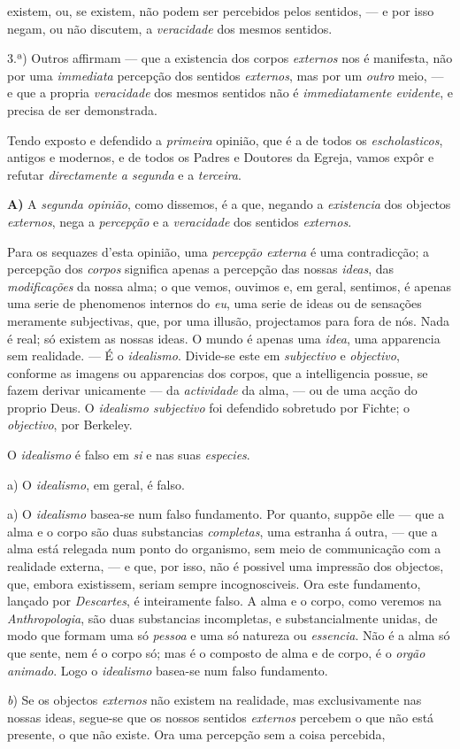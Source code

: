 existem, ou, se existem, não podem ser percebidos pelos sentidos, --- e por isso negam, ou não discutem, a \emph{veracidade} dos mesmos sentidos.\par 3.ª) Outros affirmam --- que a existencia dos corpos \emph{externos} nos é manifesta, não por uma \emph{immediata} percepção dos sentidos \emph{externos}, mas por um \emph{outro} meio, --- e que a propria \emph{veracidade} dos mesmos sentidos não é \emph{immediatamente evidente}, e precisa de ser demonstrada.\par Tendo exposto e defendido a \emph{primeira} opinião, que é a de todos os \emph{escholasticos}, antigos e modernos, e de todos os Padres e Doutores da Egreja, vamos expôr e refutar \emph{directamente a segunda} e a \emph{terceira}.\par \textbf{A)} A \emph{segunda opinião}, como dissemos, é a que, negando a \emph{existencia} dos objectos \emph{externos}, nega a \emph{percepção} e a \emph{veracidade} dos sentidos \emph{externos}.\par {}Para os sequazes d'esta opinião, uma \emph{percepção externa} é uma contradicção; a percepção dos \emph{corpos} significa apenas a percepção das nossas \emph{ideas}, das \emph{modificações} da nossa alma; o que vemos, ouvimos e, em geral, sentimos, é apenas uma serie de phenomenos internos do \emph{eu}, uma serie de ideas ou de sensações meramente subjectivas, que, por uma illusão, projectamos para fora de nós. Nada é real; só existem as nossas ideas. O mundo é apenas uma \emph{idea}, uma apparencia sem realidade. --- É o \emph{idealismo}. Divide-se este em \emph{subjectivo} e \emph{objectivo}, conforme as imagens ou apparencias dos corpos, que a intelligencia possue, se fazem derivar unicamente --- da \emph{actividade} da alma, --- ou de uma acção do proprio Deus. O \emph{idealismo subjectivo} foi defendido sobretudo por Fichte; o \emph{objectivo}, por Berkeley.\par O \emph{idealismo} é falso em \emph{si} e nas suas \emph{especies}.\par a) O \emph{idealismo}, em geral, é falso.\par a) O \emph{idealismo} basea-se num falso fundamento. Por quanto, suppõe elle --- que a alma e o corpo são duas substancias \emph{completas}, uma estranha á outra, --- que a alma está relegada num ponto do organismo, sem meio de communicação com a realidade externa, --- e que, por isso, não é possivel uma impressão dos objectos, que, embora existissem, seriam sempre incognosciveis. Ora este fundamento, lançado por \emph{Descartes}, é inteiramente falso. A alma e o corpo, como veremos na \emph{Anthropologia}, são duas substancias incompletas, e substancialmente unidas, de modo que formam uma só \emph{pessoa} e uma só natureza ou \emph{essencia}. Não é a alma só que sente, nem é o corpo só; mas é o composto de alma e de corpo, é o \emph{orgão animado}. Logo o \emph{idealismo} basea-se num falso fundamento.\par \emph{b}) Se os objectos \emph{externos} não existem na realidade, mas exclusivamente nas nossas ideas, segue-se que os nossos sentidos \emph{externos} percebem o que não está presente, o que não existe. Ora uma percepção sem a coisa percebida, 